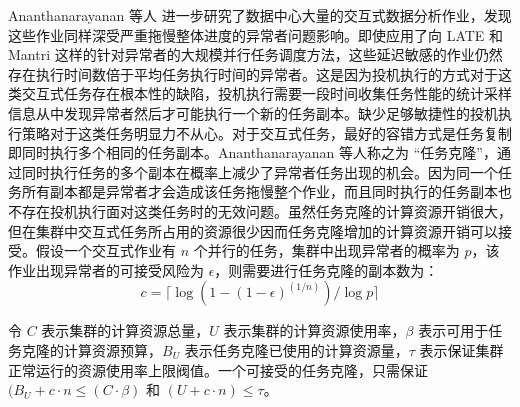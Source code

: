 Ananthanarayanan 等人 \cite{180304} 进一步研究了数据中心大量的交互式数据分析作业，发现这些作业同样深受严重拖慢整体进度的异常者问题影响。即使应用了向 LATE \cite{Zaharia:2008:IMP:1855741.1855744} 和 Mantri \cite{Ananthanarayanan:2010:ROM:1924943.1924962} 这样的针对异常者的大规模并行任务调度方法，这些延迟敏感的作业仍然存在执行时间数倍于平均任务执行时间的异常者。这是因为投机执行的方式对于这类交互式任务存在根本性的缺陷，投机执行需要一段时间收集任务性能的统计采样信息从中发现异常者然后才可能执行一个新的任务副本。缺少足够敏捷性的投机执行策略对于这类任务明显力不从心。对于交互式任务，最好的容错方式是任务复制即同时执行多个相同的任务副本。Ananthanarayanan 等人称之为 ``任务克隆''，通过同时执行任务的多个副本在概率上减少了异常者任务出现的机会。因为同一个任务所有副本都是异常者才会造成该任务拖慢整个作业，而且同时执行的任务副本也不存在投机执行面对这类任务时的无效问题。虽然任务克隆的计算资源开销很大，但在集群中交互式任务所占用的资源很少因而任务克隆增加的计算资源开销可以接受。假设一个交互式作业有 $n$ 个并行的任务，集群中出现异常者的概率为 $p$，该作业出现异常者的可接受风险为 $\epsilon$，则需要进行任务克隆的副本数为：
\begin{equation} \nonumber
c = \lceil \log(1-(1-\epsilon)^{(1/n)})/\log p \rceil
\end{equation}

令 $C$ 表示集群的计算资源总量，$U$ 表示集群的计算资源使用率，$\beta$ 表示可用于任务克隆的计算资源预算，$B_U$ 表示任务克隆已使用的计算资源量，$\tau$ 表示保证集群正常运行的资源使用率上限阀值。一个可接受的任务克隆，只需保证 $(B_U + c \cdot n \leq (C \cdot \beta)$ 和 $(U + c \cdot n) \leq \tau$。

